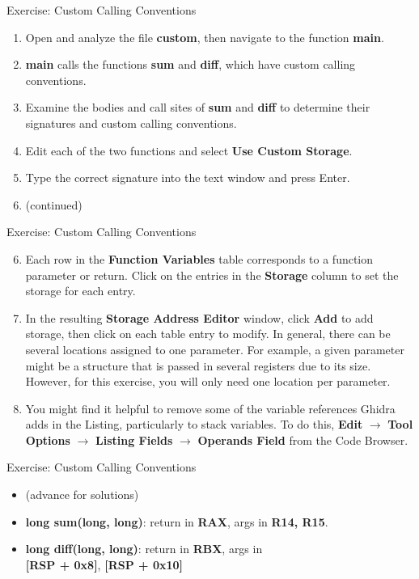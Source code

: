 \documentclass{beamer}
\begin{document}
\begin{frame}
\begin{block}{Exercise: Custom Calling Conventions}
\begin{enumerate}
\item Open and analyze the file \textbf{custom}, then navigate to the function \textbf{main}. 
\item \textbf{main} calls the functions \textbf{sum} and \textbf{diff}, which have custom calling conventions.
\item Examine the bodies and call sites of \textbf{sum} and \textbf{diff} to determine their signatures and custom calling conventions.
\item Edit each of the two functions and select \textbf{Use Custom Storage}.
\item Type the correct signature into the text window and press Enter.
\item[] (continued)
\end{enumerate}
\end{block}
\end{frame}

\begin{frame}
\begin{block}{Exercise: Custom Calling Conventions}
\begin{enumerate}
\setcounter{enumi}{5}
\item Each row in the \textbf{Function Variables} table corresponds to a function parameter or return. Click on the entries in the \textbf{Storage} 
column to set the storage for each entry.
\item In the resulting \textbf{Storage Address Editor} window, click \textbf{Add} to add storage, then click on each
table entry to modify. In general, there can be several locations assigned to one parameter. For example, a given parameter might be a structure that is passed
in several registers due to its size.  However, for this exercise, you will only need one location per parameter.
\item You might find it helpful to remove some of the variable references Ghidra adds in the Listing, particularly to stack variables.  To do this, \textbf{Edit} 
$\rightarrow$ \textbf{Tool Options} $\rightarrow$ \textbf{Listing Fields} $\rightarrow$ \textbf{Operands Field} from the Code Browser.
\end{enumerate}
\end{block}
\end{frame}

\begin{frame}
\begin{block}{Exercise: Custom Calling Conventions}
\begin{itemize}
\item[] (advance for solutions)
\pause
\item \textbf{long sum(long, long)}: return in \textbf{RAX}, args in \textbf{R14, R15}.
\item \textbf{long diff(long, long)}: return in \textbf{RBX}, args in \\ \textbf{[RSP + 0x8]}, \textbf{[RSP + 0x10]}
\end{itemize}
\end{block}
\end{frame}
\end{document}
